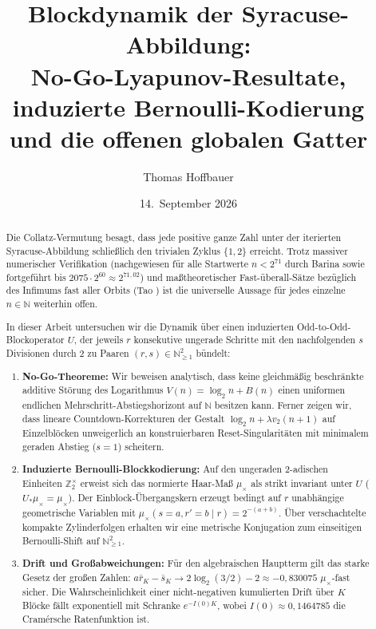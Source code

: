 \documentclass[11pt,reqno]{amsart}
\title{\textbf{\texorpdfstring{
Blockdynamik der Syracuse-Abbildung:\\
No-Go-Lyapunov-Resultate, induzierte Bernoulli-Kodierung\\
und die offenen globalen Gatter
}{
Blockdynamik der Syracuse-Abbildung:
No-Go-Lyapunov-Resultate, induzierte Bernoulli-Kodierung
und die offenen globalen Gatter
}}}
\author{Thomas Hoffbauer}
\date{14.~September 2026}
\theoremstyle{definition}
\theoremstyle{remark}
\numberwithin{equation}{section}
\begin{document}
\maketitle

\begin{abstract}
Die Collatz-Vermutung besagt, dass jede positive ganze Zahl unter der iterierten Syracuse-Abbildung schlie\ss{}lich den trivialen Zyklus $\{1, 2\}$ erreicht. Trotz massiver numerischer Verifikation (nachgewiesen f\"ur alle Startwerte $n < 2^{71}$ durch Barina \cite{Barina2025} sowie fortgef\"uhrt bis $2075 \cdot 2^{60} \approx 2^{71{,}02}$) und ma\ss{}theoretischer Fast-\"uberall-S\"atze bez\"uglich des Infimums fast aller Orbits (Tao \cite{Tao2019}) ist die universelle Aussage f\"ur jedes einzelne $n \in \mathbb{N}$ weiterhin offen.

In dieser Arbeit untersuchen wir die Dynamik \"uber einen induzierten Odd-to-Odd-Blockoperator $U$, der jeweils $r$ konsekutive ungerade Schritte mit den nachfolgenden $s$ Divisionen durch 2 zu Paaren $(r, s) \in \mathbb{N}_{\ge1}^2$ b\"undelt:
\begin{enumerate}
\item \textbf{No-Go-Theoreme:} Wir beweisen analytisch, dass keine gleichm\"a\ss{}ig beschr\"ankte additive St\"orung des Logarithmus $V(n) = \log_2 n + B(n)$ einen uniformen endlichen Mehrschritt-Abstiegshorizont auf $\mathbb{N}$ besitzen kann. Ferner zeigen wir, dass lineare Countdown-Korrekturen der Gestalt $\log_2 n + \lambda v_2(n+1)$ auf Einzelbl\"ocken unweigerlich an konstruierbaren Reset-Singularit\"aten mit minimalem geraden Abstieg ($s=1$) scheitern.
\item \textbf{Induzierte Bernoulli-Blockkodierung:} Auf den ungeraden $2$-adischen Einheiten $\mathbb{Z}_2^\times$ erweist sich das normierte Haar-Ma\ss{} $\mu_\times$ als strikt invariant unter $U$ ($U_* \mu_\times = \mu_\times$). Der Einblock-\"Ubergangskern erzeugt bedingt auf $r$ unabh\"angige geometrische Variablen mit $\mu_\times(s=a, r'=b \mid r) = 2^{-(a+b)}$. \"Uber verschachtelte kompakte Zylinderfolgen erhalten wir eine metrische Konjugation zum einseitigen Bernoulli-Shift auf $\mathbb{N}_{\ge1}^2$.
\item \textbf{Drift und Gro\ss{}abweichungen:} F\"ur den algebraischen Hauptterm gilt das starke Gesetz der gro\ss{}en Zahlen: $a\bar{r}_K - \bar{s}_K \to 2\log_2(3/2) - 2 \approx -0{,}830075$ $\mu_\times$-fast sicher. Die Wahrscheinlichkeit einer nicht-negativen kumulierten Drift \"uber $K$ Bl\"ocke f\"allt exponentiell mit Schranke $e^{-I(0) K}$, wobei $I(0) \approx 0{,}1464785$ die Cram\'ersche Ratenfunktion ist.

\end{enumerate}
\end{abstract}
\end{document}
